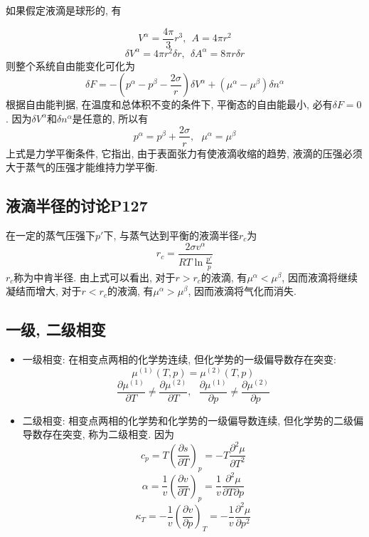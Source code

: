 如果假定液滴是球形的, 有

$$
    V^\alpha=\frac{4\pi}{3}r^3, \ \ A=4\pi r^2
$$
$$
    \delta V^\alpha=4\pi r^2\delta r, \ \ \delta A^\alpha=8\pi r\delta
    r
$$
则整个系统自由能变化可化为
$$
    \delta F=-\left(p^\alpha-p^\beta-\frac{2\sigma}{r}\right)\delta
    V^\alpha+(\mu^\alpha-\mu^\beta)\delta n^\alpha
$$
根据自由能判据, 在温度和总体积不变的条件下, 平衡态的自由能最小, 必有$\delta
    F=0$. 因为$\delta V^\alpha$和$\delta n^\alpha$是任意的, 所以有
$$
    p^\alpha=p^\beta+\frac{2\sigma}{r}, \ \ \ \mu^\alpha=\mu^\beta
$$
上式是力学平衡条件, 它指出, 由于表面张力有使液滴收缩的趋势, 液滴的压强必须大于蒸气的压强才能维持力学平衡.

\subsection{液滴半径的讨论P127}
在一定的蒸气压强下$p'$下, 与蒸气达到平衡的液滴半径$r_c$为
$$
    r_c=\frac{2\sigma v^\alpha}{RT\ln\frac{p'}{p}}
$$
$r_c$称为中肯半径. 由上式可以看出, 对于$r>r_c$的液滴, 有$\mu^\alpha<\mu^\beta$, 因而液滴将继续凝结而增大,
对于$r<r_c$的液滴, 有$\mu^\alpha>\mu^\beta$, 因而液滴将气化而消失.

\subsection{一级, 二级相变}
\begin{itemize}
    \item 一级相变: 在相变点两相的化学势连续, 但化学势的一级偏导数存在突变:
          $$
              \mu^{(1)}(T,p)=\mu^{(2)}(T,p)
          $$
          $$
              \frac{\partial\mu^{(1)}}{\partial
                  T}\neq\frac{\partial\mu^{(2)}}{\partial T}, \ \ \
              \frac{\partial\mu^{(1)}}{\partial
                  p}\neq\frac{\partial\mu^{(2)}}{\partial p}
          $$

    \item 二级相变: 相变点两相的化学势和化学势的一级偏导数连续, 但化学势的二级偏导数存在突变, 称为二级相变. 因为
          $$
              c_p=T\left(\frac{\partial s}{\partial
                  T}\right)_p=-T\frac{\partial^2\mu}{\partial T^2}
          $$
          $$
              \alpha=\frac{1}{v}\left(\frac{\partial v}{\partial
                  T}\right)_p=\frac{1}{v}\frac{\partial^2\mu}{\partial T\partial p}
          $$
          $$
              \kappa_T=-\frac{1}{v}\left(\frac{\partial v}{\partial
                  p}\right)_T=-\frac{1}{v}\frac{\partial^2\mu}{\partial p^2}
          $$
\end{itemize}

